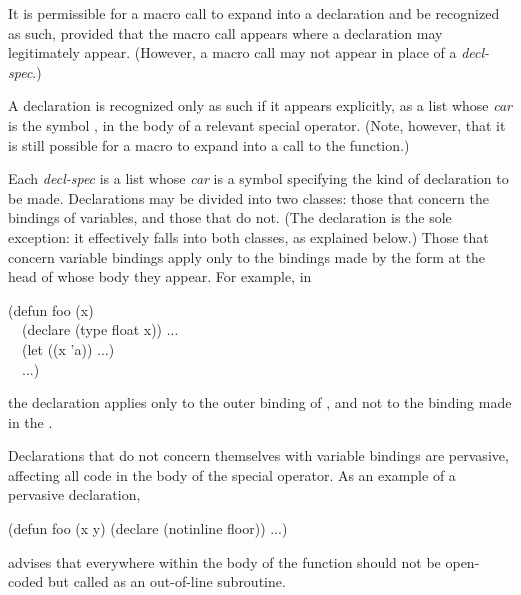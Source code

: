 \begin{defspec}
It is permissible for a macro call to expand into a declaration
and be recognized as such, provided that the macro call
appears where a declaration may legitimately appear.
(However, a macro call may not appear in place of a \emph{decl-spec}.)

A declaration is recognized only as such if
it appears explicitly, as a list whose \emph{car} is the symbol ,
in the body of a relevant special operator.  (Note, however, that it
is still possible for a macro to expand into a call to the 
function.)

Each \emph{decl-spec} is a list whose \emph{car} is a symbol
specifying the kind of declaration to be made.  Declarations may be
divided into two classes: those that concern the bindings of variables,
and those that do not. (The  declaration is the sole
exception: it effectively falls into both classes, as explained below.)
Those that concern variable bindings apply
only to the bindings made by the form at the head of whose body they
appear.  For example, in
\begin{lisp}
(defun foo (x) \\
~~(declare (type float x)) ... \\
~~(let ((x 'a)) ...) \\
~~...)
\end{lisp}
the  declaration applies only to the outer binding of ,
and not to the binding made in the .

Declarations that do not concern themselves with variable bindings are
pervasive, affecting all code in the body of the special operator.
As an example of a pervasive declaration,
\begin{lisp}
(defun foo (x y) (declare (notinline floor)) ...)
\end{lisp}
advises that everywhere within the body of  the function
 should not be open-coded but called as an out-of-line subroutine.


\end{defspec}
